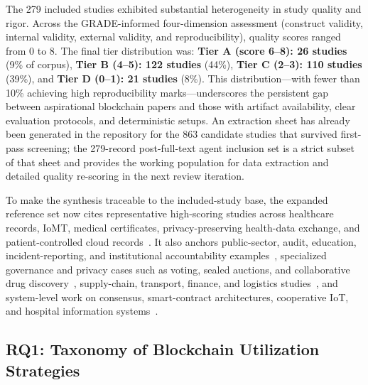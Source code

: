 \documentclass[journal]{IEEEtran}
\begin{document}
The 279 included studies exhibited substantial heterogeneity in study quality and rigor. Across the GRADE-informed four-dimension assessment (construct validity, internal validity, external validity, and reproducibility), quality scores ranged from 0 to 8. The final tier distribution was: \textbf{Tier A (score 6--8): 26 studies} (9\% of corpus), \textbf{Tier B (4--5): 122 studies} (44\%), \textbf{Tier C (2--3): 110 studies} (39\%), and \textbf{Tier D (0--1): 21 studies} (8\%). This distribution—with fewer than 10\% achieving high reproducibility marks—underscores the persistent gap between aspirational blockchain papers and those with artifact availability, clear evaluation protocols, and deterministic setups. An extraction sheet has already been generated in the repository for the 863 candidate studies that survived first-pass screening; the 279-record post-full-text agent inclusion set is a strict subset of that sheet and provides the working population for data extraction and detailed quality re-scoring in the next review iteration.

To make the synthesis traceable to the included-study base, the expanded reference set now cites representative high-scoring studies across healthcare records, IoMT, medical certificates, privacy-preserving health-data exchange, and patient-controlled cloud records~\cite{sasikumar2023heart,sammeta2021medical,thakur2026bioblock,khan2022biomt,tellew2022certificatechain,mohammadi2024scalhealth,davids2024gpoc,babu2021ehr,pandey2023healthiot,yao2024crossdomain,khan2025iomt,saxena2025chronic,alsalamah2025embryotrust,myeong2025zkphealth,ali2022homomorphic,li2022proxy}. It also anchors public-sector, audit, education, incident-reporting, and institutional accountability examples~\cite{intud2025incident,zhang2025auditing,dash2025certificate,alqodsi2025procurement,anichukwueze2021recordkeeping,wang2025exam,norainunnajah2025fertilizer}, specialized governance and privacy cases such as voting, sealed auctions, and collaborative drug discovery~\cite{schiedermeier2024anonymous,zhan2025auction,olsson2021drugdiscovery}, supply-chain, transport, finance, and logistics studies~\cite{jabbar2022its,allam2025crossborder,ballot2021physicalinternet,karkanias2026agrifood,yiu2021anticounterfeiting}, and system-level work on consensus, smart-contract architectures, cooperative IoT, and hospital information systems~\cite{fu2026flyingblocks,lin2022smartcontractsurvey,alfuhaid2023mapping,erukala2025cooperativeiot,leng2021hyperledgerhospital,iqbal2021veterinary}.

\subsection{RQ1: Taxonomy of Blockchain Utilization Strategies}
\end{document}
